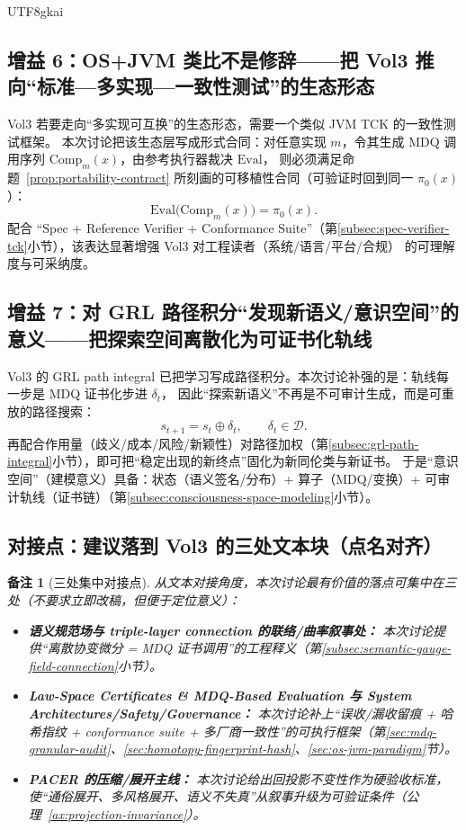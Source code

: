 \documentclass[12pt]{article}
\newtheorem{remark}{备注}[section]
\begin{document}
\begin{CJK*}{UTF8}{gkai}
\subsection{增益 6：OS+JVM 类比不是修辞——把 Vol3 推向“标准—多实现—一致性测试”的生态形态}
\label{subsec:vol3-gain-6-osjvm}

Vol3 若要走向“多实现可互换”的生态形态，需要一个类似 \textsf{JVM TCK} 的一致性测试框架。
本次讨论把该生态层写成形式合同：对任意实现 $m$，令其生成 MDQ 调用序列 $\mathrm{Comp}_m(x)$，由参考执行器裁决 $\mathrm{Eval}$，
则必须满足命题~\ref{prop:portability-contract} 所刻画的可移植性合同（可验证时回到同一 $\pi_0(x)$）：
\[
\mathrm{Eval}\bigl(\mathrm{Comp}_m(x)\bigr)=\pi_0(x).
\]
配合 “Spec + Reference Verifier + Conformance Suite”（第\ref{subsec:spec-verifier-tck}小节），该表达显著增强 Vol3 对工程读者（系统/语言/平台/合规）
  的可理解度与可采纳度。

\subsection{增益 7：对 GRL 路径积分“发现新语义/意识空间”的意义——把探索空间离散化为可证书化轨线}
\label{subsec:vol3-gain-7-grl}

Vol3 的 GRL path integral 已把学习写成路径积分。本次讨论补强的是：轨线每一步是 MDQ 证书化步进 $\delta_t$，
因此“探索新语义”不再是不可审计生成，而是可重放的路径搜索：
\[
s_{t+1}=s_t \oplus \delta_t,\qquad \delta_t\in\mathcal{D}.
\]
再配合作用量（歧义/成本/风险/新颖性）对路径加权（第\ref{subsec:grl-path-integral}小节），即可把“稳定出现的新终点”固化为新同伦类与新证书。
于是“意识空间”（建模意义）具备：状态（语义签名/分布）+ 算子（MDQ/变换）+ 可审计轨线（证书链）（第\ref{subsec:consciousness-space-modeling}小节）。

\subsection{对接点：建议落到 Vol3 的三处文本块（点名对齐）}
\label{subsec:vol3-docking-points}

\begin{remark}[三处集中对接点]
从文本对接角度，本次讨论最有价值的落点可集中在三处（不要求立即改稿，但便于定位意义）：
\begin{itemize}
  \item \textbf{语义规范场与 triple-layer connection 的联络/曲率叙事处：}
  本次讨论提供“离散协变微分 = MDQ 证书调用”的工程释义（第\ref{subsec:semantic-gauge-field-connection}小节）。
  \item \textbf{Law-Space Certificates \& MDQ-Based Evaluation 与 System Architectures/Safety/Governance：}
  本次讨论补上“误收/漏收留痕 + 哈希指纹 + conformance suite + 多厂商一致性”的可执行框架（第\ref{sec:mdq-granular-audit}、\ref{sec:homotopy-fingerprint-hash}、\ref{sec:os-jvm-paradigm}节）。
  \item \textbf{PACER 的压缩/展开主线：}
  本次讨论给出回投影不变性作为硬验收标准，使“通俗展开、多风格展开、语义不失真”从叙事升级为可验证条件（公理~\ref{ax:projection-invariance}）。
\end{itemize}
\end{remark}


\end{CJK*}
\end{document}
